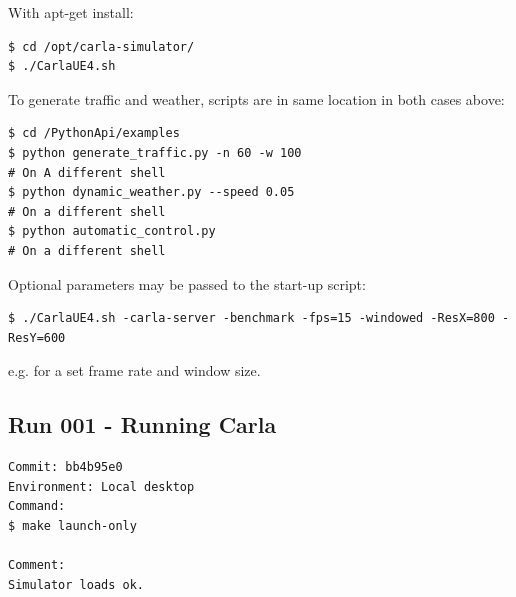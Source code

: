 With apt-get install:

\begin{verbatim}
$ cd /opt/carla-simulator/
$ ./CarlaUE4.sh
\end{verbatim}

To generate traffic and weather, scripts are in same location in both cases above:

\begin{verbatim}
$ cd /PythonApi/examples
$ python generate_traffic.py -n 60 -w 100 
# On A different shell
$ python dynamic_weather.py --speed 0.05 
# On a different shell
$ python automatic_control.py
# On a different shell
\end{verbatim}

Optional parameters may be passed to the start-up script:

\begin{verbatim}
$ ./CarlaUE4.sh -carla-server -benchmark -fps=15 -windowed -ResX=800 -ResY=600
\end{verbatim}

e.g. for a set frame rate and window size.




\subsection{Run 001 - Running Carla}
\label{app_res:001}
\begin{verbatim}
Commit: bb4b95e0
Environment: Local desktop
Command:
$ make launch-only

Comment:
Simulator loads ok.

\end{verbatim}

